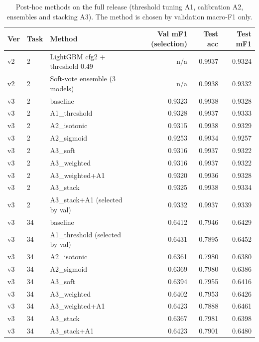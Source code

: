 \begin{table}[!t]
\centering
\caption{Post-hoc methods on the full release (threshold tuning A1, calibration A2, ensembles and stacking A3). The method is chosen by validation macro-F1 only.}\label{tab:posthoc}
\scriptsize
\setlength{\tabcolsep}{3pt}
\begin{tabular}{llp{5.2cm}rrr}
\toprule
\textbf{Ver} & \textbf{Task} & \textbf{Method} & \textbf{Val mF1 (selection)} & \textbf{Test acc} & \textbf{Test mF1} \\
\midrule
v2 & 2 & LightGBM cfg2 + threshold 0.49 & n/a & 0.9937 & 0.9324 \\
v2 & 2 & Soft-vote ensemble (3 models) & n/a & 0.9938 & 0.9332 \\
v3 & 2 & baseline & 0.9323 & 0.9938 & 0.9328 \\
v3 & 2 & A1\_threshold & 0.9328 & 0.9937 & 0.9333 \\
v3 & 2 & A2\_isotonic & 0.9315 & 0.9938 & 0.9329 \\
v3 & 2 & A2\_sigmoid & 0.9253 & 0.9934 & 0.9257 \\
v3 & 2 & A3\_soft & 0.9316 & 0.9937 & 0.9322 \\
v3 & 2 & A3\_weighted & 0.9316 & 0.9937 & 0.9322 \\
v3 & 2 & A3\_weighted+A1 & 0.9320 & 0.9936 & 0.9328 \\
v3 & 2 & A3\_stack & 0.9325 & 0.9938 & 0.9334 \\
v3 & 2 & A3\_stack+A1 (selected by val) & 0.9332 & 0.9937 & 0.9339 \\
v3 & 34 & baseline & 0.6412 & 0.7946 & 0.6429 \\
v3 & 34 & A1\_threshold (selected by val) & 0.6431 & 0.7895 & 0.6452 \\
v3 & 34 & A2\_isotonic & 0.6361 & 0.7980 & 0.6380 \\
v3 & 34 & A2\_sigmoid & 0.6369 & 0.7980 & 0.6386 \\
v3 & 34 & A3\_soft & 0.6394 & 0.7955 & 0.6416 \\
v3 & 34 & A3\_weighted & 0.6402 & 0.7953 & 0.6426 \\
v3 & 34 & A3\_weighted+A1 & 0.6423 & 0.7888 & 0.6461 \\
v3 & 34 & A3\_stack & 0.6367 & 0.7981 & 0.6398 \\
v3 & 34 & A3\_stack+A1 & 0.6423 & 0.7901 & 0.6480 \\
\bottomrule
\end{tabular}
\end{table}
